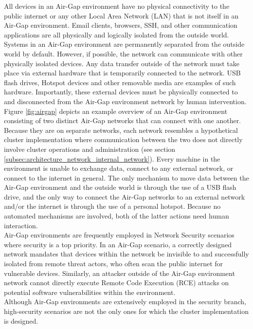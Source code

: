 All devices in an Air-Gap environment have no physical connectivity to the public
internet or any other Local Area Network (LAN) that is not itself in an Air-Gap environment.
Email clients, browsers, SSH, and other communication applications are all physically
and logically isolated from the outside world. \\ %
Systems in an Air-Gap environment are permanently separated from the outside world
by default. However, if possible, the network can communicate with other
physically isolated devices. Any data transfer outside of the network must take place
via external hardware that is temporarily connected to the network. USB flash
drives, Hotspot devices and other removable media are examples of such hardware.
Importantly, these external devices must be physically connected to and disconnected
from the Air-Gap environment network by human intervention. \\ %
Figure \ref{fig:airgap} depicts an example overview of an Air-Gap environment consisting
of two distinct Air-Gap networks that can connect with one another. Because they
are on separate networks, each network resembles a hypothetical cluster implementation
where communication between the two does not directly involve cluster operations
and administration (see section
\ref{subsec:architecture_network_internal_network}). Every machine in the
environment is unable to exchange data, connect to any external network, or
connect to the internet in general. The only mechanism to move data between the Air-Gap
environment and the outside world is through the use of a USB flash drive, and
the only way to connect the Air-Gap networks to an external network and/or the
internet is through the use of a personal hotspot. Because no automated mechanisms
are involved, both of the latter actions need human interaction. \\ %
Air-Gap environments are frequently employed in Network Security scenarios where
security is a top priority. In an Air-Gap scenario, a correctly designed network
mandates that devices within the network be invisible to and successfully
isolated from remote threat actors, who often scan the public internet for vulnerable
devices. Similarly, an attacker outside of the Air-Gap environment network cannot
directly execute Remote Code Execution (RCE) attacks on potential software vulnerabilities
within the environment\cite{airgap}. \\ %
Although Air-Gap environments are extensively employed in the security branch, high-security
scenarios are not the only ones for which the cluster implementation is designed.
